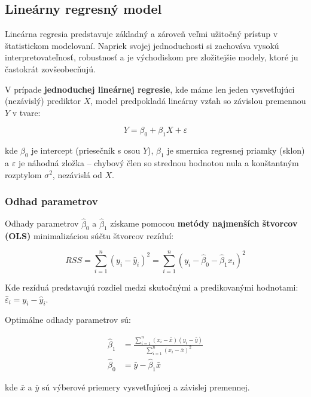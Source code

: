 \subsection{Lineárny regresný model}
\label{subsec:linear_regression}

Lineárna regresia predstavuje základný a zároveň veľmi užitočný prístup v štatistickom modelovaní. Napriek svojej jednoduchosti si zachováva vysokú interpretovateľnosť, robustnosť a je východiskom pre zložitejšie modely, ktoré ju častokrát zovšeobecňujú.

V prípade \textbf{jednoduchej lineárnej regresie}, kde máme len jeden vysvetľujúci (nezávislý) prediktor $X$, model predpokladá lineárny vzťah so závislou premennou $Y$ v tvare:

\begin{equation}
Y = \beta_0 + \beta_1 X + \varepsilon
\end{equation}

kde $\beta_0$ je intercept (priesečník s osou $Y$), $\beta_1$ je smernica regresnej priamky (sklon) a $\varepsilon$ je náhodná zložka – chybový člen so strednou hodnotou nula a konštantným rozptylom $\sigma^2$, nezávislá od $X$.

\subsubsection{Odhad parametrov}

Odhady parametrov $\hat{\beta}_0$ a $\hat{\beta}_1$ získame pomocou \textbf{metódy najmenších štvorcov (OLS)} minimalizáciou súčtu štvorcov rezíduí:

\begin{equation}
RSS = \sum_{i=1}^{n} \left( y_i - \hat{y}_i \right)^2 = \sum_{i=1}^{n} \left( y_i - \hat{\beta}_0 - \hat{\beta}_1 x_i \right)^2
\end{equation}

Kde rezíduá predstavujú rozdiel medzi skutočnými a predikovanými hodnotami: $\hat{\varepsilon}_i = y_i - \hat{y}_i$.

Optimálne odhady parametrov sú:

\begin{align}
\hat{\beta}_1 &= \frac{\sum_{i=1}^{n}(x_i - \bar{x})(y_i - \bar{y})}{\sum_{i=1}^{n}(x_i - \bar{x})^2} \\
\hat{\beta}_0 &= \bar{y} - \hat{\beta}_1 \bar{x}
\end{align}

kde $\bar{x}$ a $\bar{y}$ sú výberové priemery vysvetľujúcej a závislej premennej.

